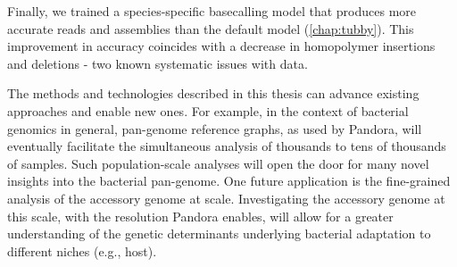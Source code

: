 Finally, we trained a species-specific \ont{} basecalling model that produces more accurate \mtb{} reads and assemblies than the default model (\autoref{chap:tubby}). This improvement in accuracy coincides with a decrease in homopolymer insertions and deletions - two known systematic issues with \ont{} data.


\hspace{0.75cm} 

\noindent
The methods and technologies described in this thesis can advance existing approaches and enable new ones. For example, in the context of bacterial genomics in general, pan-genome reference graphs, as used by Pandora, will eventually facilitate the simultaneous analysis of thousands to tens of thousands of samples. Such population-scale analyses will open the door for many novel insights into the bacterial pan-genome. One future application is the fine-grained analysis of the accessory genome at scale. Investigating the accessory genome at this scale, with the resolution Pandora enables, will allow for a greater understanding of the genetic determinants underlying bacterial adaptation to different niches (e.g., host).


